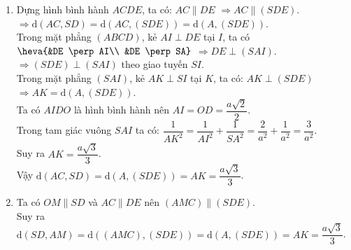 \begin{vd}
{\begin{enumerate}
			Vậy $\mathrm{d}(SC, BD) = OH = \dfrac{a\sqrt{6}}{6}$.
			\item Dựng hình bình hành $ACDE$, ta có: $AC \parallel DE$ $\Rightarrow AC \parallel (SDE)$.\\
			$\Rightarrow \mathrm{d}(AC, SD) = \mathrm{d}(AC, (SDE)) = \mathrm{d}(A, (SDE))$.\\
			Trong mặt phẳng $(ABCD)$, kẻ $AI \perp DE$ tại $I$, ta có $\heva{&DE \perp AI\\ &DE \perp SA}$ $\Rightarrow DE \perp (SAI)$.\\
			$\Rightarrow (SDE) \perp (SAI)$ theo giao tuyến $SI$.\\
			Trong mặt phẳng $(SAI)$, kẻ $AK \perp SI$ tại $K$, ta có: $AK \perp (SDE)$ $\Rightarrow AK = \mathrm{d}(A, (SDE))$.\\
			Ta có $AIDO$ là hình bình hành nên $AI = OD = \dfrac{a\sqrt{2}}{2}$.\\
			Trong tam giác vuông $SAI$ ta có: $\dfrac{1}{AK^2} = \dfrac{1}{AI^2} + \dfrac{1}{SA^2} = \dfrac{2}{a^2} + \dfrac{1}{a^2} = \dfrac{3}{a^2}$.\\
			Suy ra $AK = \dfrac{a\sqrt{3}}{3}$.\\
			Vậy $\mathrm{d}(AC, SD) = \mathrm{d}(A, (SDE)) = AK = \dfrac{a\sqrt{3}}{3}$.
			\item Ta có $OM \parallel SD$ và $AC \parallel DE$ nên $(AMC) \parallel (SDE)$.\\
			Suy ra $\mathrm{d}(SD, AM) = \mathrm{d}((AMC), (SDE)) = \mathrm{d}(A, (SDE)) = AK = \dfrac{a\sqrt{3}}{3}$.
		\end{enumerate}
	}
\end{vd}

